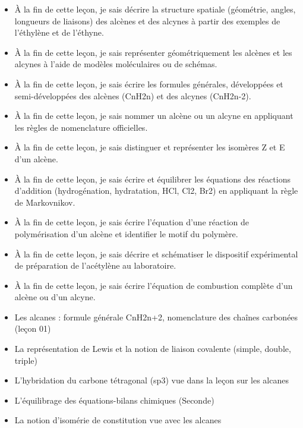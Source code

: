 \documentclass[11pt]{article}
\begin{document}
\begin{objectifs}
\begin{itemize}
\item À la fin de cette leçon, je sais décrire la structure spatiale (géométrie, angles, longueurs de liaisons) des alcènes et des alcynes à partir des exemples de l'éthylène et de l'éthyne.
\item À la fin de cette leçon, je sais représenter géométriquement les alcènes et les alcynes à l'aide de modèles moléculaires ou de schémas.
\item À la fin de cette leçon, je sais écrire les formules générales, développées et semi-développées des alcènes (CnH2n) et des alcynes (CnH2n-2).
\item À la fin de cette leçon, je sais nommer un alcène ou un alcyne en appliquant les règles de nomenclature officielles.
\item À la fin de cette leçon, je sais distinguer et représenter les isomères Z et E d'un alcène.
\item À la fin de cette leçon, je sais écrire et équilibrer les équations des réactions d'addition (hydrogénation, hydratation, HCl, Cl2, Br2) en appliquant la règle de Markovnikov.
\item À la fin de cette leçon, je sais écrire l'équation d'une réaction de polymérisation d'un alcène et identifier le motif du polymère.
\item À la fin de cette leçon, je sais décrire et schématiser le dispositif expérimental de préparation de l'acétylène au laboratoire.
\item À la fin de cette leçon, je sais écrire l'équation de combustion complète d'un alcène ou d'un alcyne.
\end{itemize}
\end{objectifs}

\begin{prerequis}
\begin{itemize}
\item Les alcanes : formule générale CnH2n+2, nomenclature des chaînes carbonées (leçon 01)
\item La représentation de Lewis et la notion de liaison covalente (simple, double, triple)
\item L'hybridation du carbone tétragonal (sp3) vue dans la leçon sur les alcanes
\item L'équilibrage des équations-bilans chimiques (Seconde)
\item La notion d'isomérie de constitution vue avec les alcanes
\end{itemize}
\end{prerequis}
\end{document}
